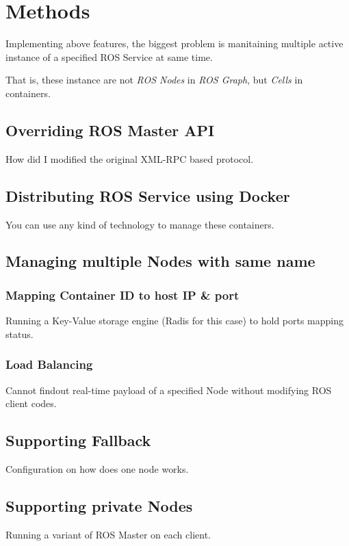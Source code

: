\section{Methods}

Implementing above features, the biggest problem is manitaining multiple active instance of a specified ROS Service at same time.

That is, these instance are not \emph{ROS Nodes} in \emph{ROS Graph}, but \emph{Cells} in containers.

\subsection{Overriding ROS Master API}
How did I modified the original XML-RPC based protocol.

\subsection{Distributing ROS Service using Docker}
You can use any kind of technology to manage these containers.

\subsection{Managing multiple Nodes with same name}
\subsubsection{Mapping Container ID to host IP \& port}
Running a Key-Value storage engine (Radis for this case) to hold ports mapping status.

\subsubsection{Load Balancing}
Cannot findout real-time payload of a specified Node without modifying ROS client codes.

\subsection{Supporting Fallback}
Configuration on how does one node works. 

\subsection{Supporting private Nodes}
Running a variant of ROS Master on each client.


